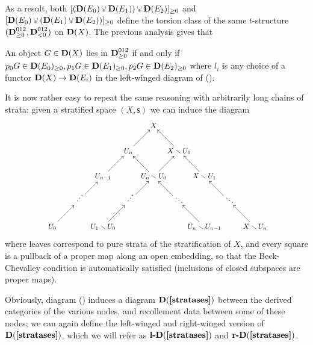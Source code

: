 As a result, both $[ (\D(E_0)\glue \D(E_1))\glue \D(E_2)]_{\ge 0}$ and $[ \D(E_0)\glue (\D(E_1)\glue \D(E_2)) ]_{\ge 0} $ define the torsion class of the same $t$\hyp{}structure $(\textbf{D}_{\ge 0}^{012}, \textbf{D}_{< 0}^{012})$ on $\textbf{D}(X)$.
\label{roruberalles}
The previous analysis gives that
\begin{scholium}
An object $G\in \textbf{D}(X)$ lies in $\textbf{D}_{\ge 0}^{012}$ if and only if $p_0G\in \textbf{D}(E_0)_{\ge 0}, p_1 G\in \textbf{D}(E_1)_{\ge 0}, p_2 G\in \textbf{D}(E_2)_{\ge 0}$ where $l_i$ is any choice of a functor $\textbf{D}(X)\to \textbf{D}(E_i)$ in the left\hyp{}winged diagram of ().
\end{scholium}
It is now rather easy to repeat the same reasoning with arbitrarily long chains of strata: given a stratified space $(X, \textsf{s})$ we can induce the diagram
\[\label{stratases}
\scalebox{.85}{ 	\xymatrix@!R=4mm@!C=4mm{
                	  	& 	& 	& 	& X \\
                	  	& 	& 	& U_n	& 	& X\setminus U_0 \\
                	  	& 	& U_{n-1}	& 	& U_n \setminus U_0	& 	& X\setminus U_1 \\
                	  	& \iddots	& 	& \iddots	& 	& \ddots	& 	& \ddots \\
                	  U_0	& 	& U_1 \setminus U_0	& 	& 	& 	& U_n \setminus U_{n-1}	& 	& X\setminus U_n
                	  \ar@{<-} "1,5";"2,6" 
                	  \ar@{<-} "1,5";"2,4" 
                	  \ar@{<-} "2,4";"3,5" 
                	  \ar@{<-} "2,4";"3,3" 
                	  \ar@{<-} "2,6";"3,7" 
                	  \ar@{<-} "2,6";"3,5" 
                	  \ar@{<-} "3,5";"4,6" 
                	  \ar@{<-} "3,5";"4,4" 
                	  \ar "4,2";"3,3" 
                	  \ar "4,8";"3,7" 
                	  \ar "5,1";"4,2" 
                	  \ar "5,3";"4,4" 
                	  \ar "5,7";"4,6" 
                	  \ar "5,9";"4,8" 
                	}}
\]where leaves correspond to pure strata of the stratification of $X$, and every square is a pullback of a proper map along an open embedding, so that the Beck\hyp{}Chevalley condition is automatically satisfied (inclusions of closed subspaces are proper maps).

Obviously, diagram () induces a diagram $\D(\refbf{stratases})$ between the derived categories of the various nodes, and recollement data between some of these nodes; we can again define the left\hyp{}winged and right\hyp{}winged version of $\D(\refbf{stratases})$, which we will refer as $\textbf{l-}\D(\refbf{stratases})$ and $\textbf{r-}\D(\refbf{stratases})$.

